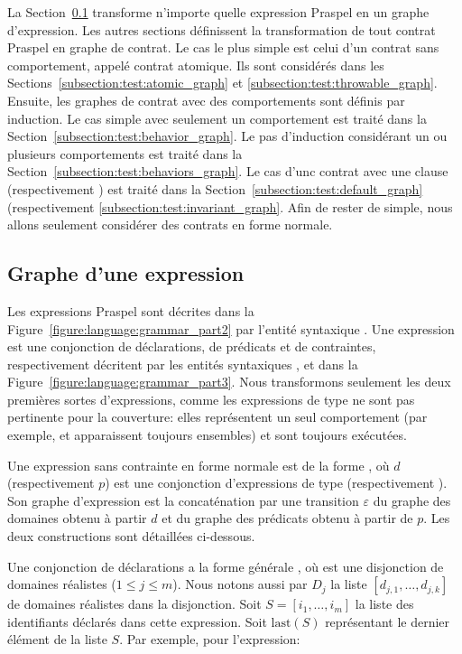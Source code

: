 La Section~\ref{subsection:test:expression_graph} transforme n'importe quelle
expression Praspel en un graphe d'expression. Les autres sections définissent la
transformation de tout contrat Praspel en graphe de contrat. Le cas le plus
simple est celui d'un contrat sans comportement, appelé {\strong contrat
atomique}. Ils sont considérés dans les
Sections~\ref{subsection:test:atomic_graph} et
\ref{subsection:test:throwable_graph}. Ensuite, les graphes de contrat avec des
comportements sont définis par induction. Le cas simple avec seulement un
comportement est traité dans la Section~\ref{subsection:test:behavior_graph}. Le
pas d'induction considérant un ou plusieurs comportements est traité dans la
Section~\ref{subsection:test:behaviors_graph}. Le cas d'unc contrat avec une
clause \adefault (respectivement \ainvariant) est traité dans la
Section~\ref{subsection:test:default_graph} (respectivement
\ref{subsection:test:invariant_graph}. Afin de rester de simple, nous allons
seulement considérer des contrats en forme normale.

\subsection{Graphe d'une expression}
\label{subsection:test:expression_graph}

Les expressions Praspel sont décrites dans la
Figure~\ref{figure:language:grammar_part2} par l'entité syntaxique
. Une expression est une conjonction de déclarations, de
prédicats et de contraintes, respectivement décritent par les entités
syntaxiques ,  et  dans la
Figure~\ref{figure:language:grammar_part3}. Nous transformons seulement les deux
premières sortes d'expressions, comme les expressions de type 
ne sont pas pertinente pour la couverture: elles représentent un seul
comportement (par exemple,  et 
apparaissent toujours ensembles) et sont toujours exécutées.

Une expression sans contrainte en forme normale est de la forme , où $d$ (respectivement $p$) est une conjonction d'expressions de type
 (respectivement ). Son graphe d'expression
est la concaténation par une transition $\varepsilon$ du {\strong graphe des
domaines} obtenu à partir $d$ et du {\strong graphe des prédicats} obtenu à
partir de $p$. Les deux constructions sont détaillées ci-dessous.

Une conjonction de déclarations a la forme générale , où  est
une disjonction de domaines réalistes ($1 \leq j \leq m$). Nous notons aussi par
$D_j$ la liste $[d_{j,1}, \dots, d_{j,k}]$ de domaines réalistes dans la
disjonction. Soit $S = [i_1, \dots, i_m]$ la liste des identifiants déclarés
dans cette expression. Soit $\mathrm{last}(S)$ représentant le dernier élément
de la liste $S$. Par exemple, pour l'expression:

